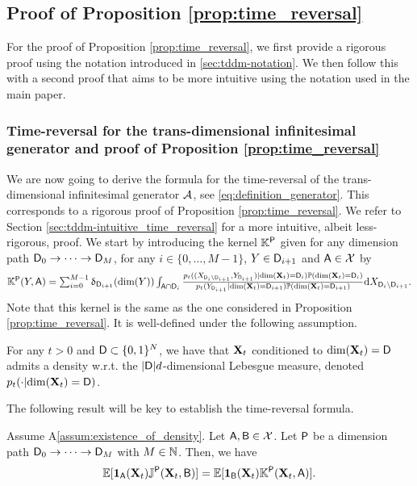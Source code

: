 \subsection{Proof of Proposition \ref{prop:time_reversal}}
For the proof of Proposition \ref{prop:time_reversal}, we first provide a rigorous proof using the notation introduced in \ref{sec:tddm-notation}. We then follow this with a second proof that aims to be more intuitive using the notation used in the main paper.

\subsubsection{Time-reversal for the trans-dimensional infinitesimal generator and proof of Proposition \ref{prop:time_reversal}}
\label{sec:tddm-rigorousProofTimeReversal}

We are now going to derive the formula for the time-reversal of the
trans-dimensional infinitesimal generator ${\mathcal{A}}$, see
\eqref{eq:definition_generator}. This corresponds to a rigorous proof of
Proposition \ref{prop:time_reversal}. We refer to Section
\ref{sec:tddm-intuitive_time_reversal} for a more intuitive, albeit less-rigorous,
proof. We start by introducing the kernel $\mathbb{K}^{\mathsf{P}}$ given for any dimension
path $\mathsf{D}_0 \to \dots \to \mathsf{D}_M$, for any $i \in \{0, \dots, M-1\}$,
$Y \in \mathsf{D}_{i+1}$ and $\mathsf{A} \in \mathcal{X}$ by
\begin{equation}
  \textstyle \mathbb{K}^{\mathsf{P}}(Y, \mathsf{A}) = \sum_{i=0}^{M-1} \updelta_{\mathsf{D}_{i+1}}(\mathrm{dim}(Y)) \int_{\mathsf{A} \cap \mathsf{D}_i} \tfrac{p_t((X_{\mathsf{D}_i \backslash \mathsf{D}_{i+1}}, Y_{\mathsf{D}_{i+1}})|\mathrm{dim}(\mathbf{X}_t)=\mathsf{D}_i)\mathbb{P}(\mathrm{dim}(\mathbf{X}_t)=\mathsf{D}_i)}{p_t(Y_{\mathsf{D}_{i+1}}|\mathrm{dim}(\mathbf{X}_t)=\mathsf{D}_{i+1})\mathbb{P}(\mathrm{dim}(\mathbf{X}_t)=\mathsf{D}_{i+1})} \mathrm{d} X_{\mathsf{D}_i \backslash \mathsf{D}_{i+1}} . 
\end{equation}
Note that this kernel is the same as the one considered in Proposition
\ref{prop:time_reversal}. It is well-defined under the following assumption.

\begin{assumption}
  \label{assum:existence_of_density}
  For any $t > 0$ and $\mathsf{D} \subset \{0,1\}^N$, we have that $\mathbf{X}_t$
  conditioned to $\mathrm{dim}(\mathbf{X}_t) = \mathsf{D}$ admits a density w.r.t. the
  $|\mathsf{D}|d$-dimensional Lebesgue measure, denoted
  $p_t(\cdot | \mathrm{dim}(\mathbf{X}_t) = \mathsf{D})$. 
\end{assumption}

The following result will be key to establish the time-reversal formula.

\begin{lemma}
  \label{lemma:flux_equation}
  Assume \textup{A\ref{assum:existence_of_density}}. Let $\mathsf{A}, \mathsf{B} \in \mathcal{X}$. Let
  $\mathsf{P}$ be a dimension path $\mathsf{D}_0 \to \dots \to \mathsf{D}_M$ with $M \in \mathbb{N}$.
  Then, we have
  \begin{equation}
    \mathbb{E}[\mathbf{1}_{\mathsf{A}}(\mathbf{X}_t) \mathbb{J}^{\mathsf{P}}(\mathbf{X}_t, \mathsf{B})] = \mathbb{E}[\mathbf{1}_{\mathsf{B}}(\mathbf{X}_t) \mathbb{K}^{\mathsf{P}}(\mathbf{X}_t, \mathsf{A})] . 
  \end{equation}
\end{lemma}


